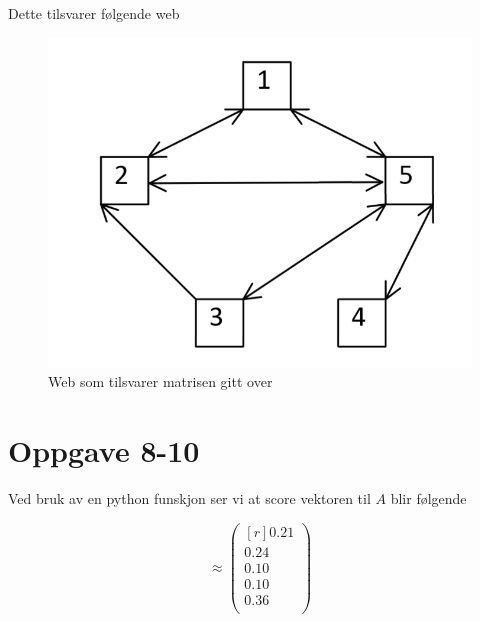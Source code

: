 \documentclass{article}
\begin{document}
Dette tilsvarer følgende web
\begin{figure}[h!]
  \centering
  \includegraphics[scale = .7]{web.png}
  \caption{Web som tilsvarer matrisen gitt over}
  \label{fig: web}
\end{figure}

\newpage
\section*{Oppgave 8-10}
Ved bruk av en python funskjon ser vi at score vektoren til $ A $ blir følgende

\[
≈
\begin{pmatrix*}[r]
 0.21 \\
 0.24 \\
 0.10 \\
 0.10 \\
 0.36 \\
\end{pmatrix*}
\]
\end{document}
